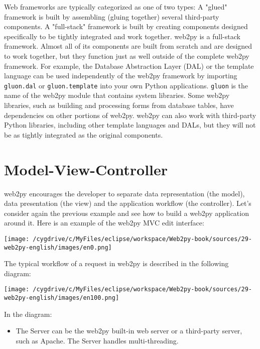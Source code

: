 \documentclass[justified,sixbynine,notoc]{tufte-book}
\def\ft{\small\tt}
\def\inxx#1{\index{#1}}
\begin{document}
\begin{fullwidth}
Web frameworks are typically categorized as one of two types: A "glued" framework is
built by assembling (gluing together) several third-party components. A "full-stack" framework is built
by creating components designed specifically to be tightly integrated and work together.
\noindent web2py is a full-stack framework. Almost all of its components are built from scratch and are designed to work
together, but they function just as well outside of the complete web2py framework. For example, the
Database Abstraction Layer (DAL) or the template language can be used independently of the
web2py framework by importing {\ft gluon.dal} or {\ft gluon.template} into your own Python applications. {\ft gluon} is the name of the web2py module that contains system libraries. Some web2py libraries,
such as building and processing forms from database tables, have dependencies on other portions
of web2py. web2py can also work with third-party Python libraries, including other template languages
and DALs, but they will not be as tightly integrated as the original components.

\goodbreak\section{Model-View-Controller}

\inxx{Model-View-Controller}
web2py encourages the developer to separate data representation (the model), data
presentation (the view) and the application workflow (the controller). Let's consider again the previous example
and see how to build a web2py application around it. Here is an example of the web2py MVC edit interface:


\goodbreak\begin{center}\texttt{[image: /cygdrive/c/MyFiles/eclipse/workspace/Web2py-book/sources/29-web2py-english/images/en0.png]}\end{center}


The typical workflow of a request in web2py is described in the following diagram:


\goodbreak\begin{center}\texttt{[image: /cygdrive/c/MyFiles/eclipse/workspace/Web2py-book/sources/29-web2py-english/images/en100.png]}\end{center}


In the diagram:
\begin{itemize}
\item The Server can be the web2py built-in web server or a third-party server, such as Apache. The Server handles multi-threading.


\end{itemize}
\end{fullwidth}
\end{document}
